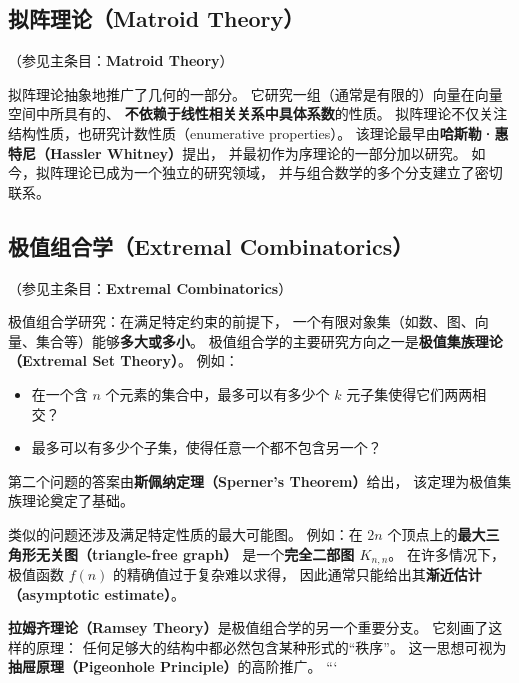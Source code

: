 \subsection*{拟阵理论（Matroid Theory）}
（参见主条目：\textbf{Matroid Theory}）

拟阵理论抽象地推广了几何的一部分。  
它研究一组（通常是有限的）向量在向量空间中所具有的、  
\textbf{不依赖于线性相关关系中具体系数}的性质。  
拟阵理论不仅关注结构性质，也研究计数性质（enumerative properties）。  
该理论最早由\textbf{哈斯勒·惠特尼（Hassler Whitney）}提出，  
并最初作为序理论的一部分加以研究。  
如今，拟阵理论已成为一个独立的研究领域，  
并与组合数学的多个分支建立了密切联系。

\subsection*{极值组合学（Extremal Combinatorics）}
（参见主条目：\textbf{Extremal Combinatorics}）

极值组合学研究：在满足特定约束的前提下，  
一个有限对象集（如数、图、向量、集合等）能够\textbf{多大或多小}。  
极值组合学的主要研究方向之一是\textbf{极值集族理论（Extremal Set Theory）}。  
例如：
\begin{itemize}
  \item 在一个含 $n$ 个元素的集合中，最多可以有多少个 $k$ 元子集使得它们两两相交？
  \item 最多可以有多少个子集，使得任意一个都不包含另一个？
\end{itemize}
第二个问题的答案由\textbf{斯佩纳定理（Sperner’s Theorem）}给出，  
该定理为极值集族理论奠定了基础。

类似的问题还涉及满足特定性质的最大可能图。  
例如：在 $2n$ 个顶点上的\textbf{最大三角形无关图（triangle-free graph）}  
是一个\textbf{完全二部图 $K_{n,n}$}。  
在许多情况下，极值函数 $f(n)$ 的精确值过于复杂难以求得，  
因此通常只能给出其\textbf{渐近估计（asymptotic estimate）}。

\textbf{拉姆齐理论（Ramsey Theory）}是极值组合学的另一个重要分支。  
它刻画了这样的原理：  
任何足够大的结构中都必然包含某种形式的“秩序”。  
这一思想可视为\textbf{抽屉原理（Pigeonhole Principle）}的高阶推广。
```



